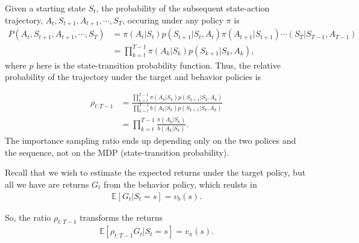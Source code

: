 Given a starting state $S_t$, the probability of the subsequent state-action trajectory, $A_t, S_{t+1}, A_{t+1},\cdots,S_T$, occuring under any policy $\pi$ is 
\begin{align*}
	P(A_t, S_{t+1}, A_{t+1},\cdots,S_T)&= \pi(A_t|S_t)p(S_{t+1}|S_t,A_t)\pi(A_{t+1}|S_{t+1})\cdots(S_T|S_{T-1},A_{T-1})\\ 
	&= \prod_{k=t}^{T-1}\pi(A_k|S_k)p(S_{k+1}|S_k,A_k),
\end{align*}
where $p$ here is the state-transition probability function. Thus, the relative probability of the trajectory under the target and behavior policies is 

\begin{align*}
	\rho_{t:T-1} &=  \frac{\prod_{k=t}^{T-1}\pi(A_k|S_k)p(S_{k+1}|S_k,A_k)}{ \prod_{k=t}^{T-1}b(A_k|S_k)p(S_{k+1}|S_k,A_k)}\\
	&= \prod_{k=t}^{T-1}\frac{\pi(A_k|S_k)}{b(A_k|S_k)}.
\end{align*}
The importance sampling ratio ends up depending only on the two polices and the sequence, not on the MDP (state-transition probability).

Recall that we wish to estimate the expected returns under the target policy, but all we have are returns $G_t$ from the behavior policy, which reulsts in 
\begin{align*}
	\mathbb{E}[G_t|S_t=s] = v_b(s).
\end{align*}

So, the ratio $\rho_{t:T-1}$ transforms the returns
\begin{align*}
	\mathbb{E}[\rho_{t:T-1} G_t|S_t=s] = v_\pi(s).
\end{align*}



%

